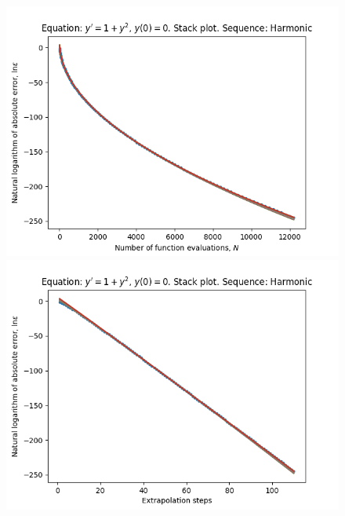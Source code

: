 \begin{figure}[H]
\centering
\begin{minipage}{0.45\textwidth}
\centering
\includegraphics[scale=0.45]{../results/emr_plots/tangens_hp_harmonic_stack.png}
\end{minipage}
\begin{minipage}{0.45\textwidth}
\centering
\includegraphics[scale=0.45]{../results/emr_plots/tangens_hp_harmonic_steps_stack.png}
\end{minipage}
\end{figure}

